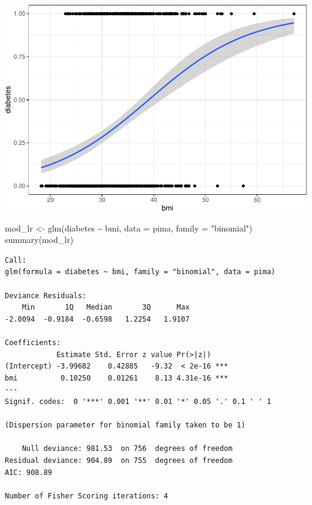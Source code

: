 \documentclass[
]{article}
\newenvironment{Shaded}{\begin{snugshade}}{\end{snugshade}}
\newcommand{\AttributeTok}[1]{\textcolor[rgb]{0.77,0.63,0.00}{#1}}
\newcommand{\FunctionTok}[1]{\textcolor[rgb]{0.00,0.00,0.00}{#1}}
\newcommand{\NormalTok}[1]{#1}
\newcommand{\OtherTok}[1]{\textcolor[rgb]{0.56,0.35,0.01}{#1}}
\newcommand{\SpecialCharTok}[1]{\textcolor[rgb]{0.00,0.00,0.00}{#1}}
\newcommand{\StringTok}[1]{\textcolor[rgb]{0.31,0.60,0.02}{#1}}
\begin{document}
\begin{center}\includegraphics{CHAP23_files/figure-latex/unnamed-chunk-12-2} \end{center}

\begin{Shaded}
\begin{Highlighting}[]
\NormalTok{mod\_lr }\OtherTok{\textless{}{-}} \FunctionTok{glm}\NormalTok{(diabetes }\SpecialCharTok{\textasciitilde{}}\NormalTok{ bmi, }\AttributeTok{data =}\NormalTok{ pima, }\AttributeTok{family =} \StringTok{"binomial"}\NormalTok{)}
\FunctionTok{summary}\NormalTok{(mod\_lr)}
\end{Highlighting}
\end{Shaded}

\begin{verbatim}
Call:
glm(formula = diabetes ~ bmi, family = "binomial", data = pima)

Deviance Residuals: 
    Min       1Q   Median       3Q      Max  
-2.0094  -0.9184  -0.6598   1.2254   1.9107  

Coefficients:
            Estimate Std. Error z value Pr(>|z|)    
(Intercept) -3.99682    0.42885   -9.32  < 2e-16 ***
bmi          0.10250    0.01261    8.13 4.31e-16 ***
---
Signif. codes:  0 '***' 0.001 '**' 0.01 '*' 0.05 '.' 0.1 ' ' 1

(Dispersion parameter for binomial family taken to be 1)

    Null deviance: 981.53  on 756  degrees of freedom
Residual deviance: 904.89  on 755  degrees of freedom
AIC: 908.89

Number of Fisher Scoring iterations: 4
\end{verbatim}
\end{document}
